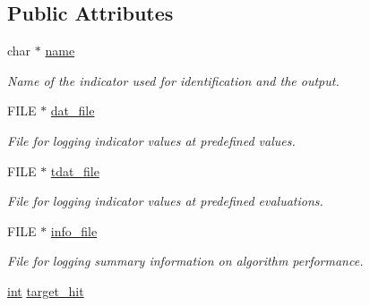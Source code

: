 \subsection*{Public Attributes}
\begin{DoxyCompactItemize}
\item 
char $\ast$ \hyperlink{structlogger__biobj__indicator__t_ae2c7761dd98f7cb8ef79f889bd5868ed}{name}\hypertarget{structlogger__biobj__indicator__t_ae2c7761dd98f7cb8ef79f889bd5868ed}{}\label{structlogger__biobj__indicator__t_ae2c7761dd98f7cb8ef79f889bd5868ed}

\begin{DoxyCompactList}\small\item\em Name of the indicator used for identification and the output. \end{DoxyCompactList}\item 
F\+I\+LE $\ast$ \hyperlink{structlogger__biobj__indicator__t_a950264d421cdf89990fa226666410ddc}{dat\+\_\+file}\hypertarget{structlogger__biobj__indicator__t_a950264d421cdf89990fa226666410ddc}{}\label{structlogger__biobj__indicator__t_a950264d421cdf89990fa226666410ddc}

\begin{DoxyCompactList}\small\item\em File for logging indicator values at predefined values. \end{DoxyCompactList}\item 
F\+I\+LE $\ast$ \hyperlink{structlogger__biobj__indicator__t_a7c06061bf090bc99480625ecffe83fab}{tdat\+\_\+file}\hypertarget{structlogger__biobj__indicator__t_a7c06061bf090bc99480625ecffe83fab}{}\label{structlogger__biobj__indicator__t_a7c06061bf090bc99480625ecffe83fab}

\begin{DoxyCompactList}\small\item\em File for logging indicator values at predefined evaluations. \end{DoxyCompactList}\item 
F\+I\+LE $\ast$ \hyperlink{structlogger__biobj__indicator__t_af84b01a1d85832786cbb7c7590049a4c}{info\+\_\+file}\hypertarget{structlogger__biobj__indicator__t_af84b01a1d85832786cbb7c7590049a4c}{}\label{structlogger__biobj__indicator__t_af84b01a1d85832786cbb7c7590049a4c}

\begin{DoxyCompactList}\small\item\em File for logging summary information on algorithm performance. \end{DoxyCompactList}\item 
\hyperlink{classint}{int} \hyperlink{structlogger__biobj__indicator__t_a5a570e1e19cc98f7014123849b36bb03}{target\+\_\+hit}\hypertarget{structlogger__biobj__indicator__t_a5a570e1e19cc98f7014123849b36bb03}{}\label{structlogger__biobj__indicator__t_a5a570e1e19cc98f7014123849b36bb03}


\end{DoxyCompactItemize}
